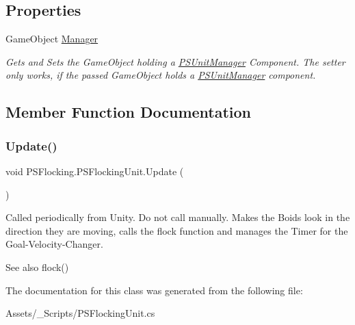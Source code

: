 \subsection*{Properties}
\begin{DoxyCompactItemize}
\item 
\mbox{\label{class_p_s_flocking_1_1_p_s_flocking_unit_ab4a20f9e1a65d566b629c59340d537dd}} 
Game\+Object \hyperlink{class_p_s_flocking_1_1_p_s_flocking_unit_ab4a20f9e1a65d566b629c59340d537dd}{Manager}
\begin{DoxyCompactList}\small\item\em Gets and Sets the Game\+Object holding a \hyperlink{class_p_s_flocking_1_1_p_s_unit_manager}{P\+S\+Unit\+Manager} Component. The setter only works, if the passed Game\+Object holds a \hyperlink{class_p_s_flocking_1_1_p_s_unit_manager}{P\+S\+Unit\+Manager} component. \end{DoxyCompactList}\end{DoxyCompactItemize}


\subsection{Member Function Documentation}
\mbox{\label{class_p_s_flocking_1_1_p_s_flocking_unit_a4bfe16a5cf81ba127fc76597cb86623a}} 
\subsubsection{\texorpdfstring{Update()}{Update()}}
{\footnotesize\ttfamily void P\+S\+Flocking.\+P\+S\+Flocking\+Unit.\+Update (\begin{DoxyParamCaption}{ }\end{DoxyParamCaption})\hspace{0.3cm}{\ttfamily [protected]}}



Called periodically from Unity. Do not call manually. Makes the Boids look in the direction they are moving, calls the flock function and manages the Timer for the Goal-\/\+Velocity-\/\+Changer. 

\begin{DoxySeeAlso}{See also}
flock() 
\end{DoxySeeAlso}


The documentation for this class was generated from the following file\+:\begin{DoxyCompactItemize}
\item 
Assets/\+\_\+\+Scripts/P\+S\+Flocking\+Unit.\+cs\end{DoxyCompactItemize}
